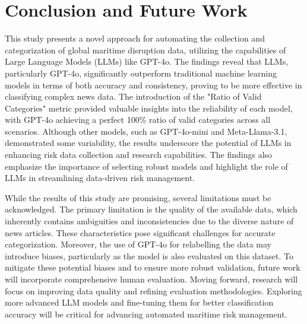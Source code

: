 \balance
\section{Conclusion and Future Work}

This study presents a novel approach for automating the collection and categorization of global maritime disruption data, utilizing the capabilities of Large Language Models (LLMs) like GPT-4o. The findings reveal that LLMs, particularly GPT-4o, significantly outperform traditional machine learning models in terms of both accuracy and consistency, proving to be more effective in classifying complex news data. The introduction of the "Ratio of Valid Categories" metric provided valuable insights into the reliability of each model, with GPT-4o achieving a perfect 100\% ratio of valid categories across all scenarios. Although other models, such as GPT-4o-mini and Meta-Llama-3.1, demonstrated some variability, the results underscore the potential of LLMs in enhancing risk data collection and research capabilities. The findings also emphasize the importance of selecting robust models and highlight the role of LLMs in streamlining data-driven risk management.

While the results of this study are promising, several limitations must be acknowledged. The primary limitation is the quality of the available data, which inherently contains ambiguities and inconsistencies due to the diverse nature of news articles. These characteristics pose significant challenges for accurate categorization.
Moreover, the use of GPT-4o for relabelling the data may introduce biases, particularly as the model is also evaluated on this dataset. To mitigate these potential biases and to ensure more robust validation, future work will incorporate comprehensive human evaluation.
Moving forward, research will focus on improving data quality and refining evaluation methodologies. Exploring more advanced LLM models and fine-tuning them for better classification accuracy will be critical for advancing automated maritime risk management.